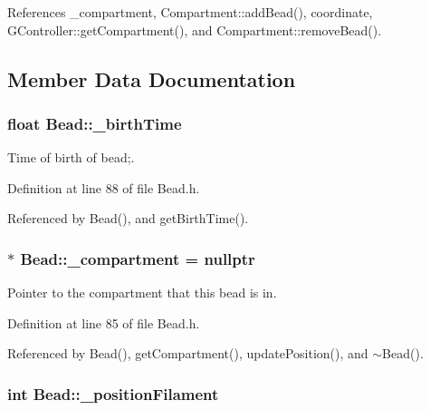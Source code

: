 References \+\_\+compartment, Compartment\+::add\+Bead(), coordinate, G\+Controller\+::get\+Compartment(), and Compartment\+::remove\+Bead().



\subsection{Member Data Documentation}
\hypertarget{classBead_a356c8525fcf176bca4cd539f735c1de6}{
\subsubsection[{\+\_\+birth\+Time}]{\setlength{\rightskip}{0pt plus 5cm}float Bead\+::\+\_\+birth\+Time\hspace{0.3cm}{\ttfamily [private]}}}\label{classBead_a356c8525fcf176bca4cd539f735c1de6}


Time of birth of bead;. 



Definition at line 88 of file Bead.\+h.



Referenced by Bead(), and get\+Birth\+Time().

\hypertarget{classBead_ac9d2080d5d8f80f60535dfeea9cd38e9}{
\subsubsection[{\+\_\+compartment}]{$\ast$ Bead\+::\+\_\+compartment = nullptr\hspace{0.3cm}{\ttfamily [private]}}}\label{classBead_ac9d2080d5d8f80f60535dfeea9cd38e9}


Pointer to the compartment that this bead is in. 



Definition at line 85 of file Bead.\+h.



Referenced by Bead(), get\+Compartment(), update\+Position(), and $\sim$\+Bead().

\hypertarget{classBead_a0eafb8f259549846d4714e6120cbc87c}{
\subsubsection[{\+\_\+position\+Filament}]{\setlength{\rightskip}{0pt plus 5cm}int Bead\+::\+\_\+position\+Filament\hspace{0.3cm}{\ttfamily [private]}}}\label{classBead_a0eafb8f259549846d4714e6120cbc87c}


